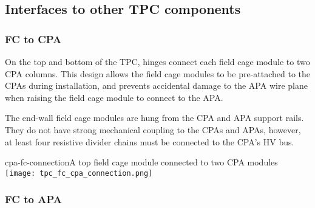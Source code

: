 





\subsection{Interfaces to other TPC components}

\subsubsection{FC to CPA}

On the top and bottom of the TPC, hinges connect each field cage module to two CPA columns.  This design allows the field cage modules to be pre-attached to the CPAs during installation, and prevents accidental damage to the APA wire plane when raising the field cage module to connect 
to the APA.

The end-wall field cage modules are hung from the CPA and APA support rails.  They do not have strong mechanical coupling to the CPAs and APAs, however, at least four resistive divider chains must be connected to the CPA's HV bus.

\begin{cdrfigure}{cpa-fc-connection}{A top field cage module connected to two CPA modules}
\texttt{[image: tpc\_fc\_cpa\_connection.png]}
\end{cdrfigure}


\subsubsection{FC to APA}

